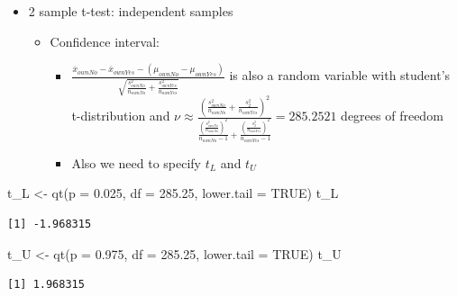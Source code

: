 \documentclass[
  ignorenonframetext,
]{beamer}
\newenvironment{Shaded}{\begin{snugshade}}{\end{snugshade}}
\newcommand{\AttributeTok}[1]{\textcolor[rgb]{0.40,0.45,0.13}{#1}}
\newcommand{\ConstantTok}[1]{\textcolor[rgb]{0.56,0.35,0.01}{#1}}
\newcommand{\FloatTok}[1]{\textcolor[rgb]{0.68,0.00,0.00}{#1}}
\newcommand{\FunctionTok}[1]{\textcolor[rgb]{0.28,0.35,0.67}{#1}}
\newcommand{\NormalTok}[1]{\textcolor[rgb]{0.00,0.23,0.31}{#1}}
\newcommand{\OtherTok}[1]{\textcolor[rgb]{0.00,0.23,0.31}{#1}}
\begin{document}
\begin{frame}[fragile]{}
\label{section-19}
\begin{itemize}
\item
  2 sample t-test: independent samples

  \begin{itemize}
  \item
    Confidence interval:

    \begin{itemize}
    \item
      \(\frac{\overline{x}_{ownNo} - \overline{x}_{ownYes} - (\mu_{ownNo} - \mu_{ownYes})}{\sqrt{\frac{s^2_{ownNo}}{n_{ownNo} } +\frac{s^2_{ownYes}}{n_{ownYes}}}}\)
      is also a random variable with student's t-distribution and
      \(\nu \approx \frac{(\frac{s_{ownNo}^2}{n_{ownNo}} + \frac{s_2^2}{n_{ownYes}})^2}{\frac{(\frac{s_{ownNo}^2}{n_{ownNo}})^2}{n_{ownNo}-1} + \frac{(\frac{s_2^2}{n_{ownYes}})^2}{n_{ownYes}-1}} = 285.2521\)
      degrees of freedom
    \item
      Also we need to specify \(t_L\) and \(t_U\)
    \end{itemize}
  \end{itemize}
\end{itemize}

\tiny

\begin{Shaded}
\begin{Highlighting}[]
\NormalTok{t\_L }\OtherTok{\textless{}{-}} \FunctionTok{qt}\NormalTok{(}\AttributeTok{p =} \FloatTok{0.025}\NormalTok{, }\AttributeTok{df =} \FloatTok{285.25}\NormalTok{, }\AttributeTok{lower.tail =} \ConstantTok{TRUE}\NormalTok{)}
\NormalTok{t\_L}
\end{Highlighting}
\end{Shaded}

\begin{verbatim}
[1] -1.968315
\end{verbatim}

\begin{Shaded}
\begin{Highlighting}[]
\NormalTok{t\_U }\OtherTok{\textless{}{-}} \FunctionTok{qt}\NormalTok{(}\AttributeTok{p =} \FloatTok{0.975}\NormalTok{, }\AttributeTok{df =} \FloatTok{285.25}\NormalTok{, }\AttributeTok{lower.tail =} \ConstantTok{TRUE}\NormalTok{)}
\NormalTok{t\_U}
\end{Highlighting}
\end{Shaded}

\begin{verbatim}
[1] 1.968315
\end{verbatim}
\end{frame}
\end{document}
